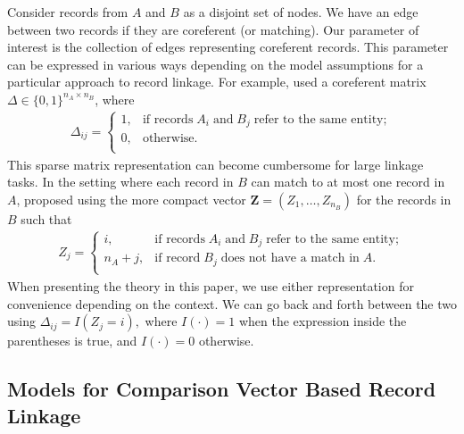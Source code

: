 \documentclass[12pt,letterpaper]{article}
\newcommand{\1}[1]{\mathbb{I}\!\left[#1\right]} %
\begin{document}
Consider records from $A$ and $B$ as a disjoint set of nodes. We have an edge between two records if they are coreferent (or matching). Our parameter of interest is the collection of edges representing coreferent records. This parameter can be expressed in various ways depending on the model assumptions for a particular approach to record linkage. For example, \cite{fellegi_theory_1969} used a coreferent matrix $\Delta \in \{0, 1\}^{n_A \times n_B}$, where
\begin{align}\label{eqn:delta-notation}
	\Delta_{ij} =
	\begin{cases}
		1, & \text{if records}\;  A_i \; \text{and}\; B_j \; \text{refer to the same entity}; \\
		0, & \text{otherwise}.\\
	\end{cases}
\end{align}
This sparse matrix representation can become cumbersome for large linkage tasks. In the setting where each record in $B$ can match to at most one record in $A$, \cite{sadinle_bayesian_2017} proposed using the more compact vector $\bm{Z} = (Z_1, \ldots, Z_{n_B})$ for the records in $B$ such that
\begin{align*}%
	Z_{j} =
	\begin{cases}
		i, & \text{if records}\;  A_i \; \text{and}\; B_j  \; \text{refer to the same entity}; \\
		n_A + j, & \text{if record}\;  B_j \; \text{does not have a match in}\; A. \\
	\end{cases}
\end{align*}
When presenting the theory in this paper, we use either representation for convenience depending on the context. We can go back and forth between the two using $\Delta_{ij} = I(Z_j = i),$ where $I(\cdot) = 1$ when the expression inside the parentheses is true, and $I(\cdot) = 0$ otherwise.

\subsection{Models for Comparison Vector Based Record Linkage}\label{sec:model-review}
\end{document}

